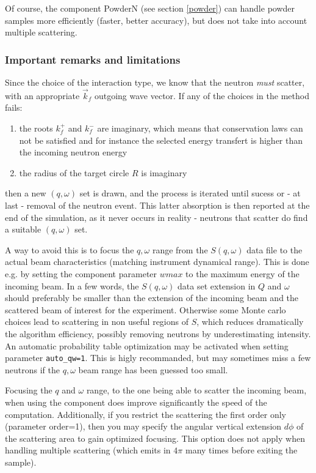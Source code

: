 Of course, the component PowderN (see section \ref{powder}) can handle powder samples more efficiently (faster, better accuracy), but does not take into account multiple scattering.

\subsubsection{Important remarks and limitations}

Since the choice of the interaction type, we know that the neutron \emph{must} scatter, with an appropriate $\vec k_f$ outgoing wave vector. If any of the choices in the method fails:
\begin{enumerate}
\item the roots $k_f^+$ and $k_f^-$ are imaginary, which means that conservation laws can not be satisfied and for instance the selected energy transfert is higher than the incoming neutron energy
\item the radius of the target circle $R$ is imaginary
\end{enumerate}
then a new $(q, \omega)$ set is drawn, and the process is iterated until sucess or - at last - removal of the neutron event. This latter absorption is then reported at the end of the simulation, as it never occurs in reality - neutrons that scatter do find a suitable $(q, \omega)$ set.

A way to avoid this is to focus the $q,\omega$ range from the $S(q, \omega)$ data file to the actual beam characteristics (matching instrument dynamical range). This is done e.g. by setting the component parameter $wmax$ to the maximum energy of the incoming beam. In a few words, the $S(q,\omega)$ data set extension in $Q$ and $\omega$ should preferably be smaller than the extension of the incoming beam and the scattered beam of interest for the experiment. Otherwise some Monte carlo choices lead to scattering in non useful regions of $S$, which reduces dramatically the algorithm efficiency, possibly removing neutrons by underestimating intensity. An automatic probability table optimization may be activated when setting parameter \verb+auto_qw=1+. This is higly recommanded, but may sometimes miss a few neutrons if the $q,\omega$ beam range has been guessed too small.

Focusing the $q$ and $\omega$ range, to the one being able to scatter the incoming beam, when using the component does improve significantly the speed of the computation. Additionally, if you restrict the scattering the first order only (parameter order=1), then you may specify the angular vertical extension $d\phi$ of the scattering area to gain optimized focusing. This option does not apply when handling multiple scattering (which emits in $4\pi$ many times before exiting the sample).

